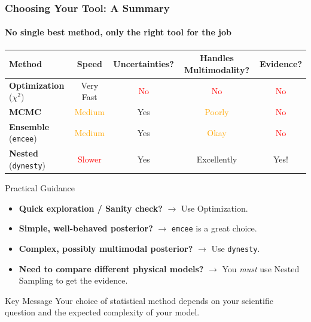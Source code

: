 \documentclass[aspectratio=169]{beamer}
\begin{document}
\begin{frame}
    \frametitle{Choosing Your Tool: A Summary}
    \framesubtitle{No single best method, only the right tool for the job}
    
    \begin{center}
        \begin{tabular}{|l|c|c|c|c|}
            \hline
            \textbf{Method} & \textbf{Speed} & \textbf{Uncertainties?} & \textbf{Handles Multimodality?} & \textbf{Evidence?} \\
            \hline
            \textbf{Optimization} ($\chi^2$) & \textcolor{green!50!black}{Very Fast} & \textcolor{red}{No} & \textcolor{red}{No} & \textcolor{red}{No} \\
            \hline
            \textbf{MCMC} & \textcolor{orange}{Medium} & \textcolor{green!50!black}{Yes} & \textcolor{orange}{Poorly} & \textcolor{red}{No} \\
            \hline
            \textbf{Ensemble} (\texttt{emcee}) & \textcolor{orange}{Medium} & \textcolor{green!50!black}{Yes} & \textcolor{orange}{Okay} & \textcolor{red}{No} \\
            \hline
            \textbf{Nested} (\texttt{dynesty}) & \textcolor{red}{Slower} & \textcolor{green!50!black}{Yes} & \textcolor{green!50!black}{Excellently} & \textcolor{green!50!black}{Yes!} \\
            \hline
        \end{tabular}
    \end{center}
    
    \vspace{2em}
    
    \begin{block}{Practical Guidance}
        \begin{itemize}
            \item \textbf{Quick exploration / Sanity check?} $\rightarrow$ Use Optimization.
            \item \textbf{Simple, well-behaved posterior?} $\rightarrow$ \texttt{emcee} is a great choice.
            \item \textbf{Complex, possibly multimodal posterior?} $\rightarrow$ Use \texttt{dynesty}.
            \item \textbf{Need to compare different physical models?} $\rightarrow$ You \textit{must} use Nested Sampling to get the evidence.
        \end{itemize}
    \end{block}
    
    \begin{alertblock}{Key Message}
        Your choice of statistical method depends on your scientific question and the expected complexity of your model.
    \end{alertblock}
\end{frame}
\end{document}
